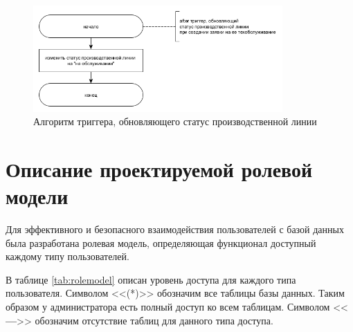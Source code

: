 \begin{figure}[H]
    \centering
    \includegraphics[width=0.85\textwidth]{inc/img/trigger4.png}
    \caption{Алгоритм триггера, обновляющего статус производственной линии}
    \label{img:trigger4}
\end{figure}

\section{Описание проектируемой ролевой модели}

Для эффективного и безопасного взаимодействия пользователей с базой данных была разработана ролевая модель, определяющая функционал доступный каждому типу пользователей.

В таблице \ref{tab:rolemodel} описан уровень доступа для каждого типа пользователя. Символом <<(*)>> обозначим все таблицы базы данных. Таким образом у администратора есть полный доступ ко всем таблицам. Символом <<\textbf{---}>> обозначим отсутствие таблиц для данного типа доступа.





